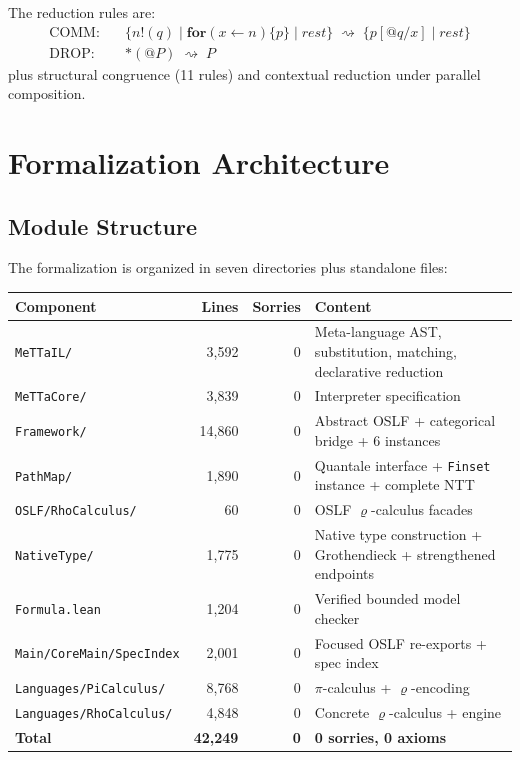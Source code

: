 \documentclass[]{article}
\newcommand{\code}[1]{\texttt{#1}}
\newcommand{\rhocalc}{\ensuremath{\varrho}}
\newcommand{\OSLF}{\textup{OSLF}}
\begin{document}
The reduction rules are:
\begin{align}
  \text{COMM:}\quad & \{n!(q) \mid \mathbf{for}(x \leftarrow n)\{p\} \mid \mathit{rest}\}
    \;\rightsquigarrow\; \{p[@q/x] \mid \mathit{rest}\} \\
  \text{DROP:}\quad & *(@P) \;\rightsquigarrow\; P
\end{align}
plus structural congruence (11 rules) and contextual reduction under parallel composition.

\section{Formalization Architecture}

\subsection{Module Structure}

The formalization is organized in seven directories plus standalone files:

\begin{center}
\begin{tabular}{lrrl}
\textbf{Component} & \textbf{Lines} & \textbf{Sorries} & \textbf{Content} \\
\hline
\code{MeTTaIL/}        & 3{,}592 & 0  & Meta-language AST, substitution, matching, declarative reduction \\
\code{MeTTaCore/}      & 3{,}839 & 0  & Interpreter specification \\
\code{Framework/}      & 14{,}860 & 0  & Abstract \OSLF{} + categorical bridge + 6 instances \\
\code{PathMap/}        & 1{,}890 & 0  & Quantale interface + \code{Finset} instance + complete NTT \\
\code{OSLF/RhoCalculus/} &    60 & 0  & \OSLF{} \rhocalc{}-calculus facades \\
\code{NativeType/}     & 1{,}775 & 0  & Native type construction + Grothendieck + strengthened endpoints \\
\code{Formula.lean}    & 1{,}204 & 0  & Verified bounded model checker \\
\code{Main/CoreMain/SpecIndex} & 2{,}001 & 0 & Focused \OSLF{} re-exports + spec index \\
\hline
\code{Languages/PiCalculus/}  & 8{,}768 & 0  & $\pi$-calculus + \rhocalc{}-encoding \\
\code{Languages/RhoCalculus/} & 4{,}848 & 0  & Concrete \rhocalc{}-calculus + engine \\
\hline
\textbf{Total}         & \textbf{42{,}249} & \textbf{0} & \textbf{0 sorries, 0 axioms}
\end{tabular}
\end{center}
\end{document}
